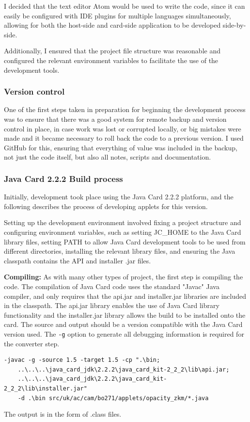 \documentclass[12pt]{article}
\begin{document}
I decided that the text editor Atom would be used to write the code, since it can easily be configured with IDE plugins for multiple languages simultaneously, allowing for both the host-side and card-side application to be developed side-by-side.

Additionally, I ensured that the project file structure was reasonable and configured the relevant environment variables to facilitate the use of the development tools.


\subsubsection{Version control}
One of the first steps taken in preparation for beginning the development process was to ensure that there was a good system for remote backup and version control in place, in case work was lost or corrupted locally, or big mistakes were made and it became necessary to roll back the code to a previous version. I used GitHub for this, ensuring that everything of value was included in the backup, not just the code itself, but also all notes, scripts and documentation.

\subsubsection{Java Card 2.2.2 Build process}
\label{build_process}

Initially, development took place using the Java Card 2.2.2 platform, and the following describes the process of developing applets for this version.

Setting up the development environment involved fixing a project structure and configuring environment variables, such as setting JC\_HOME to the Java Card library files, setting PATH to allow Java Card development tools to be used from different directories, installing the relevant library files, and ensuring the Java classpath contains the API and installer .jar files.

\textbf{Compiling:} As with many other types of project, the first step is compiling the code. The compilation of Java Card code uses the standard "Javac" Java compiler, and only requires that the api.jar and installer.jar libraries are included in the classpath. The api.jar library enables the use of Java Card library functionality and the installer.jar library allows the build to be installed onto the card. The source and output should be a version compatible with the Java Card version used. The \verb|-g| option to generate all debugging information is required for the converter step.
\begin{verbatim}
-javac -g -source 1.5 -target 1.5 -cp ".\bin;
    ..\..\..\java_card_jdk\2.2.2\java_card_kit-2_2_2\lib\api.jar;
    ..\..\..\java_card_jdk\2.2.2\java_card_kit-2_2_2\lib\installer.jar" 
    -d .\bin src/uk/ac/cam/bo271/applets/opacity_zkm/*.java 
\end{verbatim}
The output is in the form of .class files.
\end{document}
